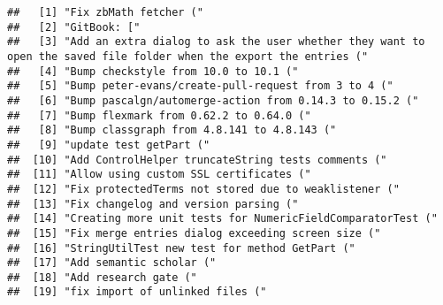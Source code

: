 \documentclass[
]{article}
\begin{document}
\begin{verbatim}
##   [1] "Fix zbMath fetcher ("                                                                                                       
##   [2] "GitBook: ["                                                                                                                 
##   [3] "Add an extra dialog to ask the user whether they want to open the saved file folder when the export the entries ("          
##   [4] "Bump checkstyle from 10.0 to 10.1 ("                                                                                        
##   [5] "Bump peter-evans/create-pull-request from 3 to 4 ("                                                                         
##   [6] "Bump pascalgn/automerge-action from 0.14.3 to 0.15.2 ("                                                                     
##   [7] "Bump flexmark from 0.62.2 to 0.64.0 ("                                                                                      
##   [8] "Bump classgraph from 4.8.141 to 4.8.143 ("                                                                                  
##   [9] "update test getPart ("                                                                                                      
##  [10] "Add ControlHelper truncateString tests comments ("                                                                          
##  [11] "Allow using custom SSL certificates ("                                                                                      
##  [12] "Fix protectedTerms not stored due to weaklistener ("                                                                        
##  [13] "Fix changelog and version parsing ("                                                                                        
##  [14] "Creating more unit tests for NumericFieldComparatorTest ("                                                                  
##  [15] "Fix merge entries dialog exceeding screen size ("                                                                           
##  [16] "StringUtilTest new test for method GetPart ("                                                                               
##  [17] "Add semantic scholar ("                                                                                                     
##  [18] "Add research gate ("                                                                                                        
##  [19] "fix import of unlinked files ("                                                                                             

\end{verbatim}
\end{document}
